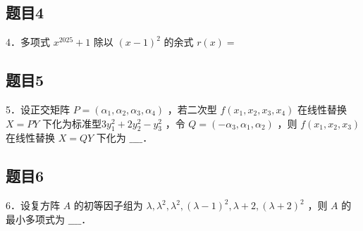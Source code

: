 \documentclass{article}
\begin{document}
\subsection{题目4}
4．多项式 \(x^{2025}+1\) 除以 \((x-1)^{2}\) 的余式 \(r(x)=\)

\subsection{题目5}
5．设正交矩阵 \(P=\left(\alpha_{1}, \alpha_{2}, \alpha_{3}, \alpha_{4}\right)\) ，若二次型 \(f\left(x_{1}, x_{2}, x_{3}, x_{4}\right)\) 在线性替换 \(X=P Y\) 下化为标准型\(3 y_{1}^{2}+2 y_{2}^{2}-y_{3}^{2}\) ，令 \(Q=\left(-\alpha_{3}, \alpha_{1}, \alpha_{2}\right)\) ，则 \(f\left(x_{1}, x_{2}, x_{3}\right)\) 在线性替换 \(X=Q Y\) 下化为 \(\_\_\_\_\)．

\subsection{题目6}
6．设复方阵 \(A\) 的初等因子组为 \(\lambda, \lambda^{2}, \lambda^{2},(\lambda-1)^{2}, \lambda+2,(\lambda+2)^{2}\) ，则 \(A\) 的最小多项式为 \(\_\_\_\_\)．
\end{document}

